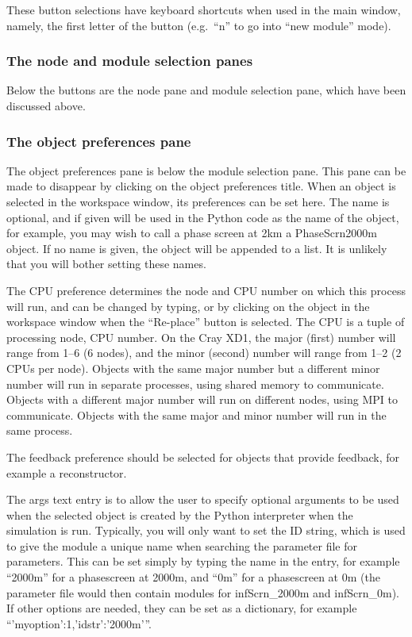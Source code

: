 \documentclass{article}
\begin{document}
These button selections have keyboard shortcuts when used in the main
window, namely, the first letter of the button (e.g.\ ``n'' to go into
``new module'' mode).

\subsubsection{The node and module selection panes}
Below the buttons are the node pane and module selection pane, which
have been discussed above.  

\subsubsection{The object preferences pane}
The object preferences pane is below the module selection pane.
This pane can be made to disappear by clicking on the object
preferences title.  When an object is selected in the workspace
window, its preferences can be set here.  The name is optional, and if
given will be used in the Python code as the name of the object, for
example, you may wish to call a phase screen at 2km a PhaseScrn2000m
object.  If no name is given, the object will be appended to a list.
It is unlikely that you will bother setting these names.  

The CPU preference determines the node and CPU number on which this
process will run, and can be changed by typing, or by clicking on the
object in the workspace window when the ``Re-place'' button is
selected.  The CPU is a tuple of processing node, CPU number.  On the
Cray XD1, the major (first) number will range from 1--6 (6 nodes), and
the minor (second) number will range from 1--2 (2 CPUs per node).
Objects with the same major number but a different minor number will
run in separate processes, using shared memory to communicate.
Objects with a different major number will run on different nodes,
using MPI to communicate.  Objects with the same major and minor
number will run in the same process.

The feedback preference should be selected for objects that provide
feedback, for example a reconstructor.  

The args text entry is to allow the user to specify optional arguments
to be used when the selected object is created by the Python
interpreter when the simulation is run.  Typically, you will only want
to set the ID string, which is used to give the module a unique name
when searching the parameter file for parameters.  This can be set
simply by typing the name in the entry, for example ``2000m'' for a
phasescreen at 2000m, and ``0m'' for a phasescreen at 0m (the
parameter file would then contain modules for infScrn\_2000m and
infScrn\_0m).  If other options are needed, they can be set as a
dictionary, for example ``{'myoption':1,'idstr':'2000m'}''.  
\end{document}

